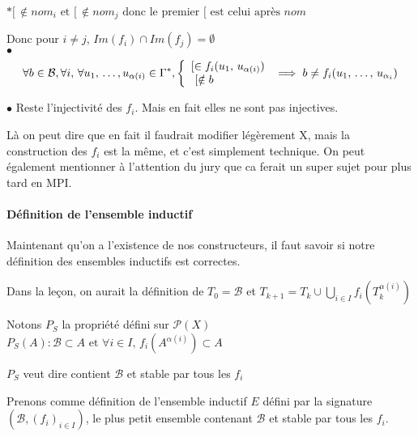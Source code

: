 $* [  \, \notin nom_i \text{ et }  [ \, \notin nom_j \text{ donc le premier [ est celui après } nom$

Donc pour $i \neq j$, $Im(f_i) \cap Im(f_j) = \emptyset$\\

$\bullet$
$$
\forall b \in \mathcal B, \forall i, \, \forall u_1, \, \dots, u_{\alpha(i)} \in \Gamma^*, \left\{ \begin{array}{l}
	[ \in f_i(u_1, \, u_{\alpha(i)}) \\ [ \notin b
\end{array}\right. \implies b \neq f_i(u_1,\, \dots, \, u_{\alpha_i})
$$

$\bullet$ Reste l'injectivité des $f_i$. Mais en fait elles ne sont pas injectives.

\begin{com}
	Là on peut dire que en fait il faudrait modifier légèrement X, mais la construction des $f_i$ est la même, et c'est simplement technique. On peut également mentionner à l'attention du jury que ca ferait un super sujet pour plus tard en MPI.
\end{com}

\paragraph{Définition de l'ensemble inductif} Maintenant qu'on a l'existence de nos constructeurs, il faut savoir si notre définition des ensembles inductifs est correctes.

\begin{com}
	Dans la leçon, on aurait la définition de $T_0 = \mathcal B$ et $T_{k+1} = T_k \cup \bigcup\limits_{i \in I} f_i\left(T_k^{\alpha(i)}\right)$
\end{com}

Notons $P_S$ la propriété défini sur $\mathcal P(X)$ $P_S(A) : \mathcal B \subset A \text{ et } \forall i \in I, \, f_i\left( A^{\alpha(i)} \right) \subset A$

\begin{com}
	$P_S$ veut dire contient $\mathcal B$ et stable par tous les $f_i$
\end{com}

Prenons comme définition de l'ensemble inductif $E$ défini par la signature $(\mathcal B, (f_i)_{i \in I})$, le plus petit ensemble contenant $\mathcal B$ et stable par tous les $f_i$.

